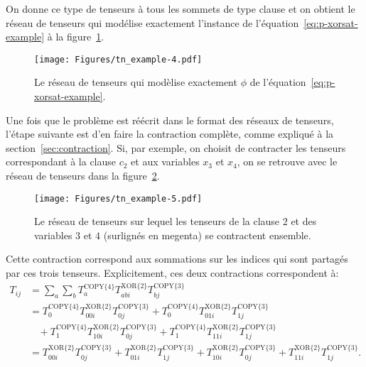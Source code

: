 On donne ce type de tenseurs à tous les sommets de type clause et on obtient le réseau de tenseurs qui modélise exactement l'instance de l'équation~\ref{eq:p-xorsat-example} à la figure~\ref{fig:tn-example4}.
\begin{figure}[h]
    \centering
    \texttt{[image: Figures/tn\_example-4.pdf]}
    \caption{Le réseau de tenseurs qui modèlise exactement $\phi$ de l'équation~\ref{eq:p-xorsat-example}.}
    \label{fig:tn-example4}
\end{figure}

Une fois que le problème est réécrit dans le format des réseaux de tenseurs, l'étape suivante est d'en faire la contraction complète, comme expliqué à la section~\ref{sec:contraction}.
Si, par exemple, on choisit de contracter les tenseurs correspondant à la clause $c_2$ et aux variables $x_3$ et $x_4$, on se retrouve avec le réseau de tenseurs dans la figure~\ref{fig:tn-example5}.
\begin{figure}[h]
    \centering
    \texttt{[image: Figures/tn\_example-5.pdf]}
    \caption{Le réseau de tenseurs sur lequel les tenseurs de la clause $2$ et des variables $3$ et $4$ (surlignés en megenta) se contractent ensemble.}
    \label{fig:tn-example5}
\end{figure}
Cette contraction correspond aux sommations sur les indices qui sont partagés par ces trois tenseurs.
Explicitement, ces deux contractions correspondent à:
\begin{equation}
    \begin{split}
        T_{ij} &= \sum_{a}\sum_{b}T^{\text{COPY}\{4\}}_{a} T^{\text{XOR}\{2\}}_{abi} T^{\text{COPY}\{3\}}_{bj}\\
        &= T^{\text{COPY}\{4\}}_{0} T^{\text{XOR}\{2\}}_{00i} T^{\text{COPY}\{3\}}_{0j} + T^{\text{COPY}\{4\}}_{0} T^{\text{XOR}\{2\}}_{01i} T^{\text{COPY}\{3\}}_{1j}\\
        &\ \ \ \ + T^{\text{COPY}\{4\}}_{1} T^{\text{XOR}\{2\}}_{10i} T^{\text{COPY}\{3\}}_{0j} + T^{\text{COPY}\{4\}}_{1} T^{\text{XOR}\{2\}}_{11i} T^{\text{COPY}\{3\}}_{1j}\\
        &= T^{\text{XOR}\{2\}}_{00i} T^{\text{COPY}\{3\}}_{0j} + T^{\text{XOR}\{2\}}_{01i} T^{\text{COPY}\{3\}}_{1j} + T^{\text{XOR}\{2\}}_{10i} T^{\text{COPY}\{3\}}_{0j} + T^{\text{XOR}\{2\}}_{11i} T^{\text{COPY}\{3\}}_{1j}.\\
    \end{split}
\end{equation}
